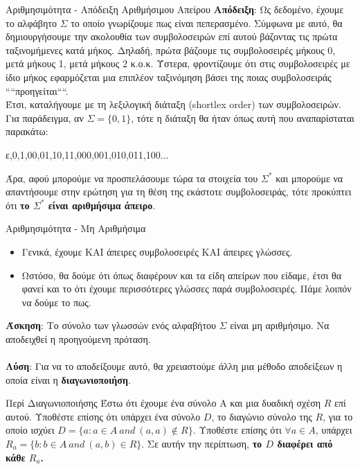 \documentclass[size=14pt, paper=smartboard, style=fyma, mode=present]{powerdot}
\begin{document}
\begin{slide}[toc=]{Αριθμησιμότητα - Απόδειξη Αριθμήσιμου Απείρου}
	\textbf{Απόδειξη}: Ως δεδομένο, έχουμε το αλφάβητο $\Sigma$ το οποίο γνωρίζουμε πως είναι πεπερασμένο. Σύμφωνα με αυτό, θα δημιουργήσουμε την ακολουθία των συμβολοσειρών επί αυτού βάζοντας τις πρώτα ταξινομήμενες κατά μήκος. Δηλαδή, πρώτα βάζουμε τις συμβολοσειρές μήκους 0, μετά μήκους 1, μετά μήκους 2 κ.ο.κ. Ύστερα, φροντίζουμε ότι στις συμβολοσειρές με ίδιο μήκος εφαρμόζεται μια επιπλέον ταξινόμηση βάσει της ποιας συμβολοσειράς ````προηγείται````. \\
	 Έτσι, καταλήγουμε με τη λεξιλογική διάταξη (\textlatin{shortlex order}) των συμβολοσειρών. Για παράδειγμα, αν $\Sigma=\{0,1\}$, τότε η διάταξη θα ήταν όπως αυτή που αναπαρίσταται παρακάτω:
	 \begin{center}
	 	ε,0,1,00,01,10,11,000,001,010,011,100...
	 \end{center}
	 Άρα, αφού μπορούμε να προσπελάσουμε τώρα τα στοιχεία του $\Sigma^*$ και μπορούμε να απαντήσουμε στην ερώτηση για τη θέση της εκάστοτε συμβολοσειράς, τότε προκύπτει ότι \textbf{το \boldmath$\Sigma^* $ \unboldmath είναι αριθμήσιμα άπειρο}.
\end{slide}
\begin{slide}[toc=]{Αριθμησιμότητα - Μη Αριθμήσιμα}
{\Large
	\begin{itemize}
		\item Γενικά, έχουμε ΚΑΙ άπειρες συμβολοσειρές ΚΑΙ άπειρες γλώσσες.
		\item Ωστόσο, θα δούμε ότι όπως διαφέρουν και τα είδη απείρων που είδαμε, έτσι θα φανεί και το ότι έχουμε περισσότερες γλώσσες παρά συμβολοσειρές. Πάμε λοιπόν να δούμε το πως.
	\end{itemize}
\textbf{Άσκηση}: Το σύνολο των γλωσσών ενός αλφαβήτου $\Sigma$ είναι μη αριθμήσιμο. Να αποδειχθεί η προηγούμενη πρόταση.
\\~\\
\textbf{Λύση}: Για να το αποδείξουμε αυτό, θα χρειαστούμε άλλη μια μέθοδο αποδείξεων η οποία είναι η \textbf{διαγωνιοποιήση}.
}
\end{slide}
\begin{slide}[toc={Διαγωνιοποιήση}]{Περί Διαγωνιοποιήσης}
\Large
{	Έστω ότι έχουμε ένα σύνολο Α και μια δυαδική σχέση $R$ επί αυτού. Υποθέστε επίσης ότι υπάρχει ένα σύνολο $D$, το διαγώνιο σύνολο της $R$, για το οποίο ισχύει $ D = \{a : a \in A ~and~ (a,a)\notin R\}$. Υποθέστε επίσης ότι $\forall a \in A$, υπάρχει $R_a = \{b: b \in A ~and~ (a,b) \in R\}$. Σε αυτήν την περίπτωση,  \textbf{το $D$ διαφέρει από κάθε $R_a$.}}
\end{slide}
\end{document}
